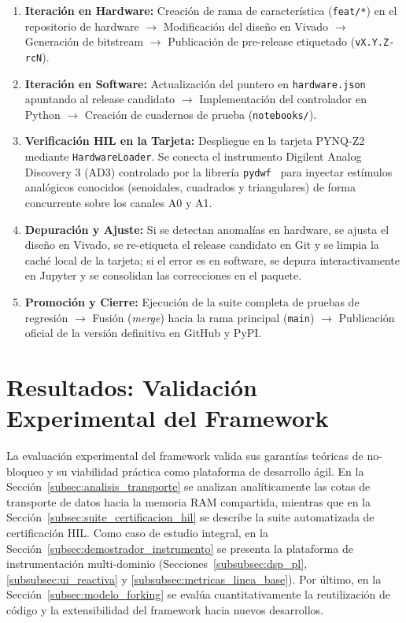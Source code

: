 \documentclass[standalone]{subfiles}
\begin{document}
\begin{enumerate}
    \item \textbf{Iteración en Hardware:} Creación de rama de característica (\texttt{feat/*}) en el repositorio de hardware $\rightarrow$ Modificación del diseño en Vivado $\rightarrow$ Generación de bitstream $\rightarrow$ Publicación de pre-release etiquetado (\texttt{vX.Y.Z-rcN}).
    
    \item \textbf{Iteración en Software:} Actualización del puntero en \texttt{hardware.json} apuntando al release candidato $\rightarrow$ Implementación del controlador en Python $\rightarrow$ Creación de cuadernos de prueba (\texttt{notebooks/}).
    
    \item \textbf{Verificación HIL en la Tarjeta:} Despliegue en la tarjeta PYNQ-Z2 mediante \texttt{HardwareLoader}. Se conecta el instrumento Digilent Analog Discovery 3 (AD3) controlado por la librería \texttt{pydwf}~\cite{digilent_waveforms_sdk} para inyectar estímulos analógicos conocidos (senoidales, cuadrados y triangulares) de forma concurrente sobre los canales A0 y A1.
    
    \item \textbf{Depuración y Ajuste:} Si se detectan anomalías en hardware, se ajusta el diseño en Vivado, se re-etiqueta el release candidato en Git y se limpia la caché local de la tarjeta; si el error es en software, se depura interactivamente en Jupyter y se consolidan las correcciones en el paquete.
    
    \item \textbf{Promoción y Cierre:} Ejecución de la suite completa de pruebas de regresión $\rightarrow$ Fusión (\textit{merge}) hacia la rama principal (\texttt{main}) $\rightarrow$ Publicación oficial de la versión definitiva en GitHub y PyPI.
\end{enumerate}

\section{Resultados: Validación Experimental del Framework}
\label{sec:resultados_framework}

La evaluación experimental del framework valida sus garantías teóricas de no-bloqueo y su viabilidad práctica como plataforma de desarrollo ágil. En la Sección~\ref{subsec:analisis_transporte} se analizan analíticamente las cotas de transporte de datos hacia la memoria RAM compartida, mientras que en la Sección~\ref{subsec:suite_certificacion_hil} se describe la suite automatizada de certificación HIL. Como caso de estudio integral, en la Sección~\ref{subsec:demostrador_instrumento} se presenta la plataforma de instrumentación multi-dominio (Secciones~\ref{subsubsec:dsp_pl}, \ref{subsubsec:ui_reactiva} y \ref{subsubsec:metricas_linea_base}). Por último, en la Sección~\ref{subsec:modelo_forking} se evalúa cuantitativamente la reutilización de código y la extensibilidad del framework hacia nuevos desarrollos.
\end{document}
